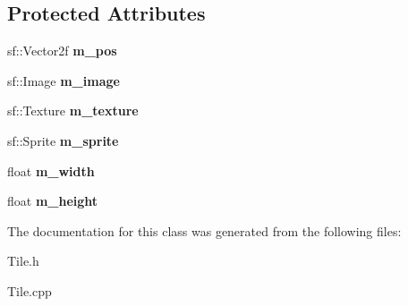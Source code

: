 \subsection*{Protected Attributes}
\begin{DoxyCompactItemize}
\item 
\mbox{\label{class_tile_a2db104a49645869763a460f650463fc5}} 
sf\+::\+Vector2f {\bfseries m\+\_\+pos}
\item 
\mbox{\label{class_tile_a6d38d678accf70344c1999ef32f0904a}} 
sf\+::\+Image {\bfseries m\+\_\+image}
\item 
\mbox{\label{class_tile_afdfb0b80d14504a7a8bde1362681c44b}} 
sf\+::\+Texture {\bfseries m\+\_\+texture}
\item 
\mbox{\label{class_tile_ab584dc2babe7b2a31da69a406da677c9}} 
sf\+::\+Sprite {\bfseries m\+\_\+sprite}
\item 
\mbox{\label{class_tile_a783a3dfd7111cb3d01542605bfa0d48d}} 
float {\bfseries m\+\_\+width}
\item 
\mbox{\label{class_tile_affb6f80dc96d18c721664ca8f1e2dcb4}} 
float {\bfseries m\+\_\+height}
\end{DoxyCompactItemize}


The documentation for this class was generated from the following files\+:\begin{DoxyCompactItemize}
\item 
Tile.\+h\item 
Tile.\+cpp\end{DoxyCompactItemize}
